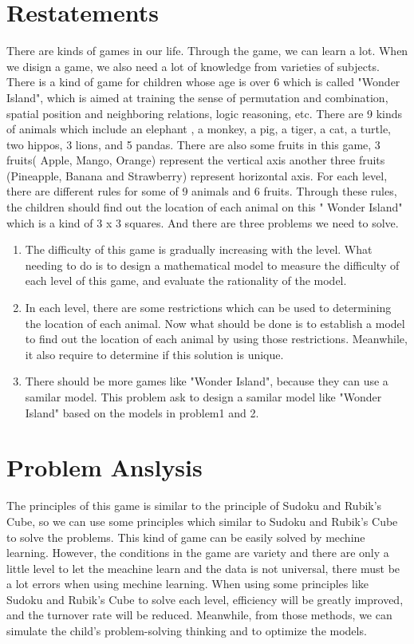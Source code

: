 \newpage
\renewcommand{\baselinestretch}{1.5}
\section{Restatements}
There are kinds of games in our life. Through the game, we can learn a lot. When we disign a game, we also need a lot of knowledge from varieties of subjects.  There is a kind of game for children whose age is over 6 which is called "Wonder Island", which is aimed at training the sense of permutation and combination, spatial position and neighboring relations, logic reasoning, etc.  There are 9 kinds of animals which include an elephant , a monkey, a pig, a tiger, a cat, a turtle, two hippos, 3 lions, and 5 pandas.  There are also some fruits in this game, 3 fruits( Apple, Mango, Orange)  represent the vertical axis another three fruits (Pineapple, Banana and Strawberry) represent horizontal axis. For each level, there are different rules for some of 9 animals and 6 fruits. Through these rules, the children should find out the location of each animal on this " Wonder Island"  which is a kind of 3 x 3 squares. And there are three problems we need to solve.

\begin{enumerate}[(1)]
\item The difficulty of this game is gradually increasing with the level. What needing to do is to design a mathematical model to measure the difficulty of each level of this game, and evaluate the rationality of the model.

\item In each level, there are some restrictions which can be used to determining the location of each animal. Now what should be done is to establish a model to find out the location of each animal by using those restrictions. Meanwhile, it also require to determine if this solution is unique.

\item There should be more games like "Wonder Island", because they can use a samilar model. This problem ask to design a samilar model like "Wonder Island" based on the models in problem1 and 2.
\end{enumerate}
\section{Problem Anslysis}
The principles of this game is similar to the principle of Sudoku and Rubik's Cube, so we can use some principles which similar to Sudoku and Rubik's Cube to solve the problems. This kind of game can be easily solved by mechine learning. However, the conditions in the game are variety and there are only a little level to let the meachine learn and the data is not universal, there must be a lot errors when using mechine learning.  When using some principles like Sudoku and Rubik's Cube to solve each level, efficiency will be greatly improved, and the turnover rate will be reduced. Meanwhile, from those methods, we can simulate the child's problem-solving thinking and to optimize the models.

